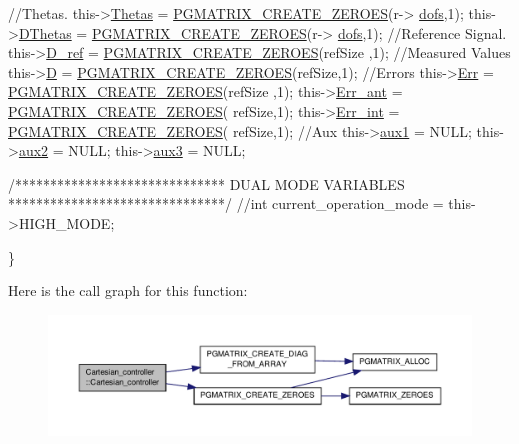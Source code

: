 \begin{DoxyCode}
        \textcolor{comment}{//Thetas.}
        this->\hyperlink{classCartesian__controller_a0a0f818dad601cd9e3e26cb6959b8eb6}{Thetas} = \hyperlink{gmatrix__plus_8h_a6cacc3f1b48d458d5cfc9e03159e3d81}{PGMATRIX\_CREATE\_ZEROES}(r->
      \hyperlink{structRobot_a51d4a86ac5314a1ed8614d5664c80747}{dofs},1);
        this->\hyperlink{classCartesian__controller_a5d6419e62e130150edfcbd82b1dadcae}{DThetas} = \hyperlink{gmatrix__plus_8h_a6cacc3f1b48d458d5cfc9e03159e3d81}{PGMATRIX\_CREATE\_ZEROES}(r->
      \hyperlink{structRobot_a51d4a86ac5314a1ed8614d5664c80747}{dofs},1);
        \textcolor{comment}{//Reference Signal.}
        this->\hyperlink{classCartesian__controller_abb248cb3215a574fe8e1bb8fb0b8626d}{D\_ref} = \hyperlink{gmatrix__plus_8h_a6cacc3f1b48d458d5cfc9e03159e3d81}{PGMATRIX\_CREATE\_ZEROES}(refSize
      ,1);
        \textcolor{comment}{//Measured Values}
        this->\hyperlink{classCartesian__controller_a8c470b652ce436d8e48f126073fc2593}{D} = \hyperlink{gmatrix__plus_8h_a6cacc3f1b48d458d5cfc9e03159e3d81}{PGMATRIX\_CREATE\_ZEROES}(refSize,1);
        \textcolor{comment}{//Errors}
        this->\hyperlink{classCartesian__controller_ab3f08ecf10cb2486e8bfc61f07e2bde6}{Err}     = \hyperlink{gmatrix__plus_8h_a6cacc3f1b48d458d5cfc9e03159e3d81}{PGMATRIX\_CREATE\_ZEROES}(refSize
      ,1);
        this->\hyperlink{classCartesian__controller_a6d9471a983f6cb6c642bf8dea0d540af}{Err\_ant} = \hyperlink{gmatrix__plus_8h_a6cacc3f1b48d458d5cfc9e03159e3d81}{PGMATRIX\_CREATE\_ZEROES}(
      refSize,1);
        this->\hyperlink{classCartesian__controller_a248174c6399a8933bfcc8f1b0b39af5e}{Err\_int} = \hyperlink{gmatrix__plus_8h_a6cacc3f1b48d458d5cfc9e03159e3d81}{PGMATRIX\_CREATE\_ZEROES}(
      refSize,1);
        \textcolor{comment}{//Aux}
        this->\hyperlink{classCartesian__controller_a37edb9c6e2a5066f74941e3659f68cbc}{aux1} = NULL;
        this->\hyperlink{classCartesian__controller_af73a0c910cd80ed2f84974b65beba450}{aux2} = NULL;
        this->\hyperlink{classCartesian__controller_aa37c15fcd53a60ecce106cd9b39d3501}{aux3} = NULL;

        \textcolor{comment}{/******************************}
\textcolor{comment}{                DUAL MODE VARIABLES}
\textcolor{comment}{        *******************************/}
        \textcolor{comment}{//int current\_operation\_mode = this->HIGH\_MODE;}

\}
\end{DoxyCode}


Here is the call graph for this function\-:\nopagebreak
\begin{figure}[H]
\begin{center}
\leavevmode
\includegraphics[width=350pt]{classCartesian__controller_a71055bb1cbf01ced9e64bb1d184b68fe_cgraph}
\end{center}
\end{figure}


